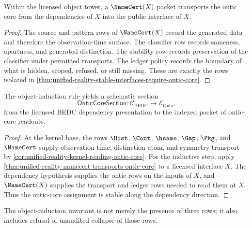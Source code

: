\begin{theorem}
\label{thm:unified-reality-namecert-transports-ontic-core}
Within the licensed object tower, a $\NameCert(X)$ packet transports the
ontic core from the dependencies of $X$ into the public interface of
$X$.
\end{theorem}

\begin{proof}
The source and pattern rows of $\NameCert(X)$ record the generated data
and therefore the observation-time surface.  The classifier row records
sameness, apartness, and generated distinction.  The stability row
records preservation of the classifier under permitted transports.  The
ledger policy records the boundary of what is hidden, scoped, refused,
or still missing.  These are exactly the rows isolated in
\autoref{thm:unified-reality-stable-interfaces-require-ontic-core}.
\end{proof}

\begin{theorem}
\label{thm:unified-reality-object-induction-yields-ontic-section}
The object-induction rule yields a schematic section
$$
\mathsf{OnticCoreSection}:
\mathcal C_{\mathrm{BEDC}}
\to
\mathcal E_{\mathrm{Ontic}}
$$
from the licensed BEDC dependency presentation to the indexed packet of
ontic-core readouts.
\end{theorem}

\begin{proof}
At the kernel base, the rows $\Hist$, $\Cont$, $\hsame$, $\Gap$,
$\Pkg$, and $\NameCert$ supply observation-time, distinction-atom, and
symmetry-transport by
\autoref{cor:unified-reality-kernel-reading-ontic-core}.  For the
inductive step, apply
\autoref{thm:unified-reality-namecert-transports-ontic-core} to a
licensed interface $X$.  The dependency hypothesis supplies the ontic
rows on the inputs of $X$, and $\NameCert(X)$ supplies the transport and
ledger rows needed to read them at $X$.  Thus the ontic-core assignment
is stable along the dependency direction.
\end{proof}

\begin{corollary}
\label{cor:unified-reality-axiom-purity-object-induction-invariant}
The object-induction invariant is not merely the presence of three
rows; it also includes refusal of unaudited collapse of those rows.
\end{corollary}

